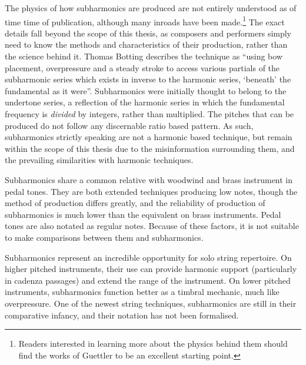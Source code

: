 The physics of how subharmonics are produced are not entirely understood as of time time of publication, although many inroads have been made.\footnote{Readers interested in learning more about the physics behind them should find the works of Guettler to be an excellent starting point.}\autocite[]{guettlerBowedStringDevelopment2002}
The exact details fall beyond the scope of this thesis, as composers and performers simply need to know the methods and characteristics of their production, rather than the science behind it.
Thomas Botting describes the technique as ``using bow placement, overpressure and a steady stroke to access various partials of the subharmonic series which exists in inverse to the harmonic series, ‘beneath’ the fundamental as it were''.\autocite[16]{bottingDevelopingPersonalVocabulary2019}
Subharmonics were initially thought to belong to the undertone series, a reflection of the harmonic series in which the fundamental frequency is \emph{divided} by integers, rather than multiplied.\autocite[]{shaahinmohajeriEqualdivisionsoflengthEdl240edo2019}
The pitches that can be produced do not follow any discernable ratio based pattern.\autocite[]{guettlerWaveAnalysisString1994}
As such, subharmonics strictly speaking are not a harmonic based technique, but remain within the scope of this thesis due to the misinformation surrounding them, and the prevailing similarities with harmonic techniques.

Subharmonics share a common relative with woodwind and brass instrument in pedal tones.
They are both extended techniques producing low notes, though the method of production differs greatly, and the reliability of production of subharmonics is much lower than the equivalent on brass instruments.
Pedal tones are also notated as regular notes.
Because of these factors, it is not suitable to make comparisons between them and subharmonics.


Subharmonics represent an incredible opportunity for solo string repertoire. 
On higher pitched instruments, their use can provide harmonic support (particularly in cadenza passages) and extend the range of the instrument. 
On lower pitched instruments, subharmonics function better as a timbral mechanic, much like overpressure. 
One of the newest string techniques, subharmonics are still in their comparative infancy, and their notation has not been formalised. 

